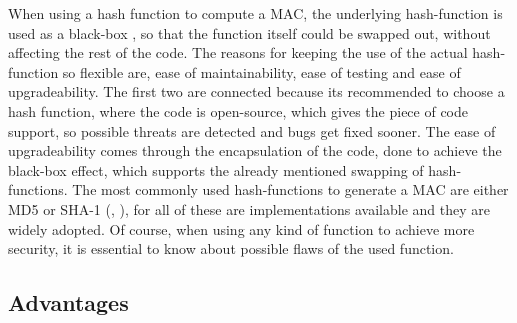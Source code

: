 When using a hash function to compute a MAC, the underlying hash-function is used as a black-box \cite{KHF}, so that the function itself could be swapped out, without affecting the rest of the code. The reasons for keeping the use of the actual hash-function so flexible are, ease of maintainability, ease of testing and ease of upgradeability. The first two are connected because its recommended to choose a hash function, where the code is open-source, which gives the piece of code support, so possible threats are detected and bugs get fixed sooner. The ease of upgradeability comes through the encapsulation of the code, done to achieve the black-box effect, which supports the already mentioned swapping of hash-functions.
The most commonly used hash-functions to generate a MAC are either MD5 or SHA-1 (\cite{CRY-MD5}, \cite{NPC}), for all of these are implementations available and they are widely adopted. Of course, when using any kind of function to achieve more security, it is essential to know about possible flaws of the used function. 
\subsection{Advantages}
